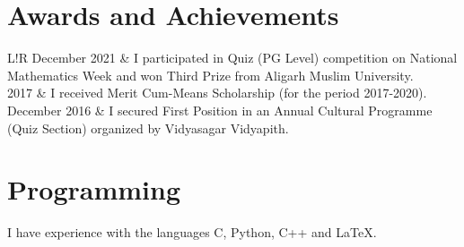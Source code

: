 \documentclass{article}
\newcommand\VRule{\color{lightgray}\vrule width 0.5pt}
\begin{document}
	\section{Awards and Achievements}
	\begin{longtable}{L!{\VRule}R}
		December 2021 & I participated in Quiz (PG Level) competition on National Mathematics Week and won Third Prize from Aligarh Muslim University.                                                                  \\
		2017        & I received Merit Cum-Means Scholarship (for the period 2017-2020).                                                  \\
		December 2016 & I secured First Position in an Annual Cultural Programme (Quiz Section) organized by Vidyasagar Vidyapith. 
		\\                            
                                                           
	\end{longtable}
	
	\section{Programming}
	I have experience with the languages C, Python, C++  and \LaTeX.
\end{document}
